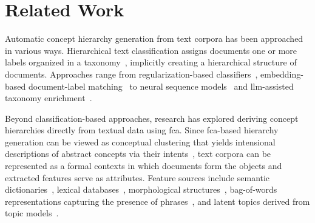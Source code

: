 \section{Related Work}
\label{sec:related_work}

Automatic concept hierarchy generation from text corpora has been approached in various ways.
Hierarchical text classification assigns documents one or more labels organized in a taxonomy~\cite{yu2022constrained}, implicitly creating a hierarchical structure of documents.
Approaches range from regularization-based classifiers~\cite{gopal2013recursive}, embedding-based document-label matching~\cite{li2019hiercon} to neural sequence models~\cite{risch2020hierarchical,yu2022constrained} and \ac{llm}-assisted taxonomy enrichment~\cite{zhang2025teleclass}.

Beyond classification-based approaches, research has explored deriving concept hierarchies directly from textual data using \ac{fca}.
Since \ac{fca}-based hierarchy generation can be viewed as conceptual clustering that yields intensional descriptions of abstract concepts via their intents~\cite{cimiano_learning_2005}, text corpora can be represented as a formal contexts in which documents form the objects and extracted features serve as attributes.
Feature sources include semantic dictionaries~\cite{Priss:2004,old:04,Priss:96}, lexical databases~\cite{Priss:96,priss:98,GalnPez2014DiscoveringNS,val:05}, morphological structures~\cite{sporleder:02,petersen:04}, bag-of-words representations capturing the presence of phrases~\cite{Elzinga:09,cigarran_twitter_fca_2016}, and latent topics derived from topic models~\cite{Aznag2014LeveragingFC,wang_topic_feature_2021,wang_topic_hierarchy_2023,hirth_ordinal_2024,gutekunst2025conceptual}.



